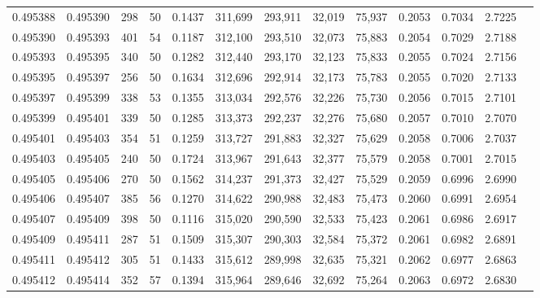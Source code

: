 \begin{tabular}{rrrrrrrrrrrrr}
0.495388 & 0.495390 &   298 &  50 &                                     0.1437 & 311,699 & 293,911 &  32,019 &  75,937 & 0.2053 & 0.7034 & 2.7225 \\
0.495390 & 0.495393 &   401 &  54 &                                     0.1187 & 312,100 & 293,510 &  32,073 &  75,883 & 0.2054 & 0.7029 & 2.7188 \\
0.495393 & 0.495395 &   340 &  50 &                                     0.1282 & 312,440 & 293,170 &  32,123 &  75,833 & 0.2055 & 0.7024 & 2.7156 \\
0.495395 & 0.495397 &   256 &  50 &                                     0.1634 & 312,696 & 292,914 &  32,173 &  75,783 & 0.2055 & 0.7020 & 2.7133 \\
0.495397 & 0.495399 &   338 &  53 &                                     0.1355 & 313,034 & 292,576 &  32,226 &  75,730 & 0.2056 & 0.7015 & 2.7101 \\
0.495399 & 0.495401 &   339 &  50 &                                     0.1285 & 313,373 & 292,237 &  32,276 &  75,680 & 0.2057 & 0.7010 & 2.7070 \\
0.495401 & 0.495403 &   354 &  51 &                                     0.1259 & 313,727 & 291,883 &  32,327 &  75,629 & 0.2058 & 0.7006 & 2.7037 \\
0.495403 & 0.495405 &   240 &  50 &                                     0.1724 & 313,967 & 291,643 &  32,377 &  75,579 & 0.2058 & 0.7001 & 2.7015 \\
0.495405 & 0.495406 &   270 &  50 &                                     0.1562 & 314,237 & 291,373 &  32,427 &  75,529 & 0.2059 & 0.6996 & 2.6990 \\
0.495406 & 0.495407 &   385 &  56 &                                     0.1270 & 314,622 & 290,988 &  32,483 &  75,473 & 0.2060 & 0.6991 & 2.6954 \\
0.495407 & 0.495409 &   398 &  50 &                                     0.1116 & 315,020 & 290,590 &  32,533 &  75,423 & 0.2061 & 0.6986 & 2.6917 \\
0.495409 & 0.495411 &   287 &  51 &                                     0.1509 & 315,307 & 290,303 &  32,584 &  75,372 & 0.2061 & 0.6982 & 2.6891 \\
0.495411 & 0.495412 &   305 &  51 &                                     0.1433 & 315,612 & 289,998 &  32,635 &  75,321 & 0.2062 & 0.6977 & 2.6863 \\
0.495412 & 0.495414 &   352 &  57 &                                     0.1394 & 315,964 & 289,646 &  32,692 &  75,264 & 0.2063 & 0.6972 & 2.6830 \\

\end{tabular}
